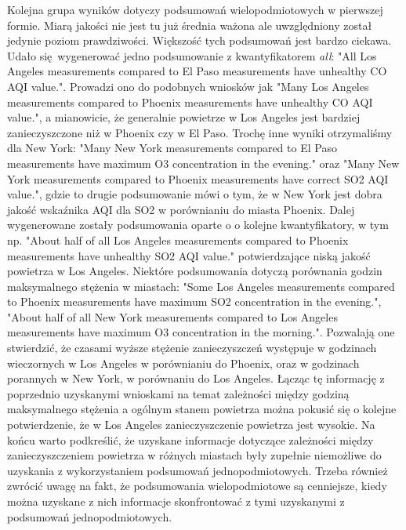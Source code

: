 \documentclass{classrep}
\begin{document}
{        Kolejna grupa wyników dotyczy podsumowań wielopodmiotowych w pierwszej formie. Miarą jakości
        nie jest tu już średnia ważona ale uwzględniony został jedynie poziom prawdziwości.
        Większość tych podsumowań jest bardzo ciekawa. Udało się wygenerować jedno podsumowanie z
        kwantyfikatorem \emph{all}: "All Los Angeles measurements compared to El Paso measurements
        have unhealthy CO AQI value.". Prowadzi ono do podobnych wniosków jak "Many Los Angeles
        measurements compared to Phoenix measurements have unhealthy CO AQI value.", a mianowicie,
        że generalnie powietrze w Los Angeles jest bardziej zanieczyszczone niż w Phoenix czy w El
        Paso. Trochę inne wyniki otrzymaliśmy dla New York: "Many New York measurements compared to
        El Paso measurements have maximum O3 concentration in the evening." oraz "Many New York
        measurements compared to Phoenix measurements have correct SO2 AQI value.", gdzie to drugie
        podsumowanie mówi o tym, że w New York jest dobra jakość wskaźnika AQI dla SO2 w porównianiu
        do miasta Phoenix. Dalej wygenerowane zostały podsumowania oparte o o kolejne
        kwantyfikatory, w tym np. "About half of all Los Angeles measurements compared to Phoenix
        measurements have unhealthy SO2 AQI value." potwierdzające niską jakość powietrza w Los
        Angeles. Niektóre podsumowania dotyczą porównania godzin maksymalnego stężenia w miastach:
        "Some Los Angeles measurements compared to Phoenix measurements have maximum SO2
        concentration in the evening.", "About half of all New York measurements compared to Los
        Angeles measurements have maximum O3 concentration in the morning.". Pozwalają one
        stwierdzić, że czasami wyższe stężenie zanieczyszczeń występuje w godzinach wieczornych w
        Los Angeles w porównianiu do Phoenix, oraz w godzinach porannych w New York, w porównaniu do
        Los Angeles. Łącząc tę informację z poprzednio uzyskanymi wnioskami na temat zależności
        między godziną maksymalnego stężenia a ogólnym stanem powietrza można pokusić się o kolejne
        potwierdzenie, że w Los Angeles zanieczyszczenie powietrza jest wysokie. Na końcu warto
        podkreślić, że uzyskane informacje dotyczące zależności między zanieczyszczeniem powietrza w
        różnych miastach były zupełnie niemożliwe do uzyskania z wykorzystaniem podsumowań
        jednopodmiotowych. Trzeba również zwrócić uwagę na fakt, że podsumowania wielopodmiotowe są
        cenniejsze, kiedy można uzyskane z nich informacje skonfrontować z tymi uzyskanymi z
        podsumowań jednopodmiotowych.

}
\end{document}
